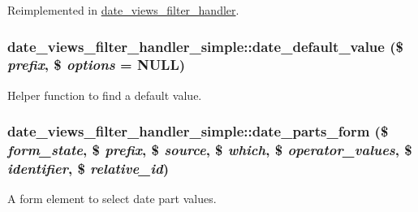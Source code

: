 Reimplemented in \hyperlink{classdate__views__filter__handler_a214c46a8a095cad6ac6159cbedbb4f35}{date\_\-views\_\-filter\_\-handler}.\hypertarget{classdate__views__filter__handler__simple_a0c2dc5d14e6b72f16fcdcf5e629fc2d3}{
\subsubsection[{date\_\-default\_\-value}]{\setlength{\rightskip}{0pt plus 5cm}date\_\-views\_\-filter\_\-handler\_\-simple::date\_\-default\_\-value (\$ {\em prefix}, \/  \$ {\em options} = {\ttfamily NULL})}}
\label{classdate__views__filter__handler__simple_a0c2dc5d14e6b72f16fcdcf5e629fc2d3}
Helper function to find a default value. \hypertarget{classdate__views__filter__handler__simple_acdc710e1ffd67920b04e73804553998a}{
\subsubsection[{date\_\-parts\_\-form}]{\setlength{\rightskip}{0pt plus 5cm}date\_\-views\_\-filter\_\-handler\_\-simple::date\_\-parts\_\-form (\$ {\em form\_\-state}, \/  \$ {\em prefix}, \/  \$ {\em source}, \/  \$ {\em which}, \/  \$ {\em operator\_\-values}, \/  \$ {\em identifier}, \/  \$ {\em relative\_\-id})}}
\label{classdate__views__filter__handler__simple_acdc710e1ffd67920b04e73804553998a}
A form element to select date part values.



